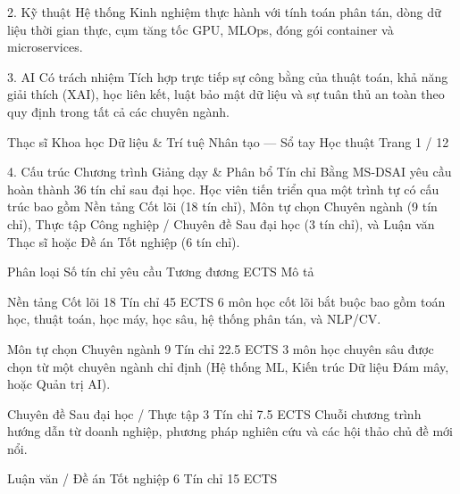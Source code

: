 \documentclass[12pt]{article}
\begin{document}
2. Kỹ thuật Hệ thống
Kinh nghiệm thực hành với tính toán phân tán, dòng dữ liệu thời gian thực, cụm tăng tốc GPU, MLOps, đóng gói container và microservices.

3. AI Có trách nhiệm
Tích hợp trực tiếp sự công bằng của thuật toán, khả năng giải thích (XAI), học liên kết, luật bảo mật dữ liệu và sự tuân thủ an toàn theo quy định trong tất cả các chuyên ngành.

Thạc sĩ Khoa học Dữ liệu & Trí tuệ Nhân tạo — Sổ tay Học thuật Trang 1 / 12

4. Cấu trúc Chương trình Giảng dạy & Phân bổ Tín chỉ
Bằng MS-DSAI yêu cầu hoàn thành 36 tín chỉ sau đại học. Học viên tiến triển qua một trình tự có cấu trúc bao gồm Nền tảng Cốt lõi (18 tín chỉ), Môn tự chọn Chuyên ngành (9 tín chỉ), Thực tập Công nghiệp / Chuyên đề Sau đại học (3 tín chỉ), và Luận văn Thạc sĩ hoặc Đề án Tốt nghiệp (6 tín chỉ).

Phân loại
Số tín chỉ yêu cầu
Tương đương ECTS
Mô tả

Nền tảng Cốt lõi
18 Tín chỉ
45 ECTS
6 môn học cốt lõi bắt buộc bao gồm toán học, thuật toán, học máy, học sâu, hệ thống phân tán, và NLP/CV.

Môn tự chọn Chuyên ngành
9 Tín chỉ
22.5 ECTS
3 môn học chuyên sâu được chọn từ một chuyên ngành chỉ định (Hệ thống ML, Kiến trúc Dữ liệu Đám mây, hoặc Quản trị AI).

Chuyên đề Sau đại học / Thực tập
3 Tín chỉ
7.5 ECTS
Chuỗi chương trình hướng dẫn từ doanh nghiệp, phương pháp nghiên cứu và các hội thảo chủ đề mới nổi.

Luận văn / Đề án Tốt nghiệp
6 Tín chỉ
15 ECTS
\end{document}
